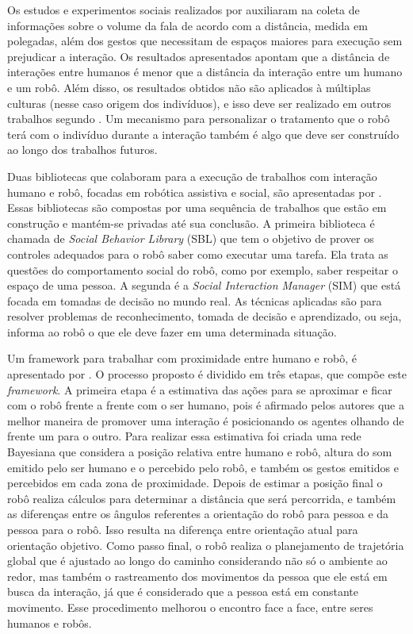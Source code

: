 Os estudos e experimentos sociais realizados por \textcite{mead:2014} auxiliaram na coleta de informações sobre o volume da fala de acordo com a distância, medida em polegadas, além dos gestos que necessitam de espaços maiores para execução sem prejudicar a interação. Os resultados apresentados apontam que a distância de interações entre humanos é menor que a distância da interação entre um humano e um robô. Além disso, os resultados obtidos não são aplicados à múltiplas culturas (nesse caso origem dos indivíduos), e isso deve ser realizado em outros trabalhos segundo \textcite{mead:2014}. Um mecanismo para personalizar o tratamento que o robô terá com o indivíduo durante a interação também é algo que deve ser construído ao longo dos trabalhos futuros.

Duas bibliotecas que colaboram para a execução de trabalhos com interação humano e robô, focadas em robótica assistiva e social, são apresentadas por \textcite{mead:2014a}. Essas bibliotecas são compostas por uma sequência de trabalhos que estão em construção e mantém-se privadas até sua conclusão. A primeira biblioteca é chamada de \emph{Social Behavior Library} (SBL) que tem o objetivo de prover os controles adequados para o robô saber como executar uma tarefa. Ela trata as questões do comportamento social do robô, como por exemplo, saber respeitar o espaço de uma pessoa. A segunda é a \emph{Social Interaction Manager} (SIM) que está focada em tomadas de decisão no mundo real. As técnicas aplicadas são para resolver problemas de reconhecimento, tomada de decisão e aprendizado, ou seja, informa ao robô o que ele deve fazer em uma determinada situação.

Um framework para trabalhar com proximidade entre humano e robô, é apresentado por \textcite{mead:2016}. O processo proposto é dividido em três etapas, que compõe este \textit{framework}. A primeira etapa é a estimativa das ações para se aproximar e ficar com o robô frente a frente com o ser humano, pois é afirmado pelos autores que a melhor maneira de promover uma interação é posicionando os agentes olhando de frente um para o outro. Para realizar essa estimativa foi criada uma rede Bayesiana que considera a posição relativa entre humano e robô, altura do som emitido pelo ser humano e o percebido pelo robô, e também os gestos emitidos e percebidos em cada zona de proximidade. Depois de estimar a posição final o robô realiza cálculos para determinar a distância que será percorrida, e também as diferenças entre os ângulos referentes a orientação do robô para pessoa e da pessoa para o robô. Isso resulta na diferença entre orientação atual para orientação objetivo. Como passo final, o robô realiza o planejamento de trajetória global que é ajustado ao longo do caminho considerando não só o ambiente ao redor, mas também o rastreamento dos movimentos da pessoa que ele está em busca da interação, já que é considerado que a pessoa está em constante movimento. Esse procedimento melhorou o encontro face a face, entre seres humanos e robôs.

